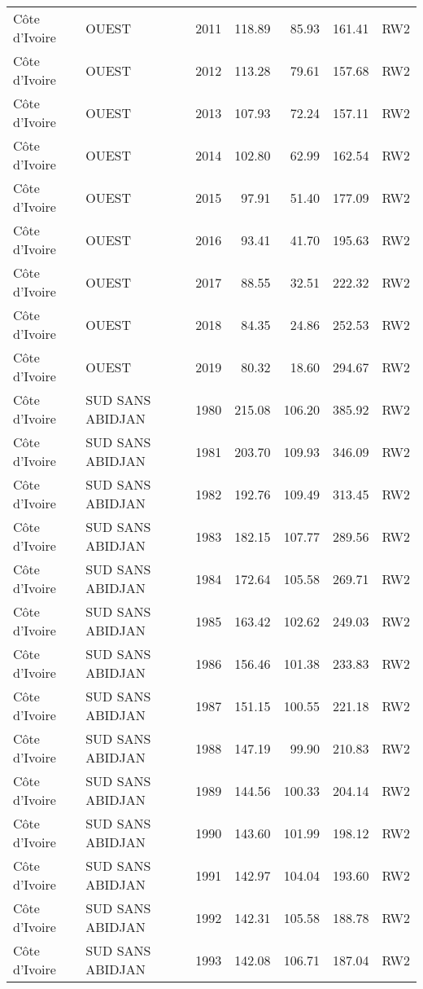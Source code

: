 \begin{longtable}{lllrrrl}
  C\^{o}te d'Ivoire & OUEST & 2011 & 118.89 & 85.93 & 161.41 & RW2 \\ 
  C\^{o}te d'Ivoire & OUEST & 2012 & 113.28 & 79.61 & 157.68 & RW2 \\ 
  C\^{o}te d'Ivoire & OUEST & 2013 & 107.93 & 72.24 & 157.11 & RW2 \\ 
  C\^{o}te d'Ivoire & OUEST & 2014 & 102.80 & 62.99 & 162.54 & RW2 \\ 
  C\^{o}te d'Ivoire & OUEST & 2015 & 97.91 & 51.40 & 177.09 & RW2 \\ 
  C\^{o}te d'Ivoire & OUEST & 2016 & 93.41 & 41.70 & 195.63 & RW2 \\ 
  C\^{o}te d'Ivoire & OUEST & 2017 & 88.55 & 32.51 & 222.32 & RW2 \\ 
  C\^{o}te d'Ivoire & OUEST & 2018 & 84.35 & 24.86 & 252.53 & RW2 \\ 
  C\^{o}te d'Ivoire & OUEST & 2019 & 80.32 & 18.60 & 294.67 & RW2 \\ 
  C\^{o}te d'Ivoire & SUD SANS ABIDJAN & 1980 & 215.08 & 106.20 & 385.92 & RW2 \\ 
  C\^{o}te d'Ivoire & SUD SANS ABIDJAN & 1981 & 203.70 & 109.93 & 346.09 & RW2 \\ 
  C\^{o}te d'Ivoire & SUD SANS ABIDJAN & 1982 & 192.76 & 109.49 & 313.45 & RW2 \\ 
  C\^{o}te d'Ivoire & SUD SANS ABIDJAN & 1983 & 182.15 & 107.77 & 289.56 & RW2 \\ 
  C\^{o}te d'Ivoire & SUD SANS ABIDJAN & 1984 & 172.64 & 105.58 & 269.71 & RW2 \\ 
  C\^{o}te d'Ivoire & SUD SANS ABIDJAN & 1985 & 163.42 & 102.62 & 249.03 & RW2 \\ 
  C\^{o}te d'Ivoire & SUD SANS ABIDJAN & 1986 & 156.46 & 101.38 & 233.83 & RW2 \\ 
  C\^{o}te d'Ivoire & SUD SANS ABIDJAN & 1987 & 151.15 & 100.55 & 221.18 & RW2 \\ 
  C\^{o}te d'Ivoire & SUD SANS ABIDJAN & 1988 & 147.19 & 99.90 & 210.83 & RW2 \\ 
  C\^{o}te d'Ivoire & SUD SANS ABIDJAN & 1989 & 144.56 & 100.33 & 204.14 & RW2 \\ 
  C\^{o}te d'Ivoire & SUD SANS ABIDJAN & 1990 & 143.60 & 101.99 & 198.12 & RW2 \\ 
  C\^{o}te d'Ivoire & SUD SANS ABIDJAN & 1991 & 142.97 & 104.04 & 193.60 & RW2 \\ 
  C\^{o}te d'Ivoire & SUD SANS ABIDJAN & 1992 & 142.31 & 105.58 & 188.78 & RW2 \\ 
  C\^{o}te d'Ivoire & SUD SANS ABIDJAN & 1993 & 142.08 & 106.71 & 187.04 & RW2 \\ 

\end{longtable}
